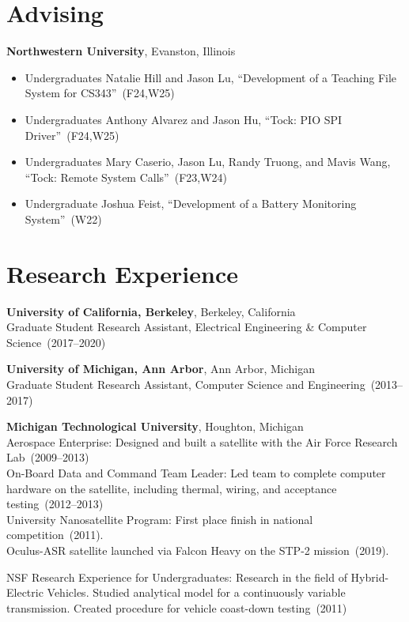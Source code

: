 \documentclass{article}
\begin{document}
\section*{Advising}
\vspace{-6pt}
{\bf Northwestern University}, Evanston, Illinois
\vspace{-6pt}
\begin{itemize}
  \item[] Undergraduates Natalie Hill and Jason Lu, ``Development of a Teaching File System for CS343''~(F24,W25)
  \item[] Undergraduates Anthony Alvarez and Jason Hu, ``Tock: PIO SPI Driver''~(F24,W25)
  \item[] Undergraduates Mary Caserio, Jason Lu, Randy Truong, and Mavis Wang, ``Tock: Remote System Calls''~(F23,W24)
  \item[] Undergraduate Joshua Feist, ``Development of a Battery Monitoring System''~(W22)
\end{itemize}


\section*{Research Experience}
\vspace{-6pt}

{\bf University of California, Berkeley}, Berkeley, California \\
Graduate Student Research Assistant, Electrical Engineering \& Computer Science~(2017--2020)

{\bf University of Michigan, Ann Arbor}, Ann Arbor, Michigan \\
Graduate Student Research Assistant, Computer Science and Engineering~(2013--2017)

{\bf Michigan Technological University}, Houghton, Michigan \\
Aerospace Enterprise: Designed and built a satellite with the Air Force Research Lab~(2009--2013) \\
On-Board Data and Command Team Leader: Led team to complete computer hardware
on the satellite, including thermal, wiring, and acceptance testing~(2012--2013) \\
University Nanosatellite Program: First place finish in national competition~(2011). \\
Oculus-ASR satellite launched via Falcon Heavy on the STP-2 mission~(2019).

NSF Research Experience for Undergraduates: Research in the field of
Hybrid-Electric Vehicles. Studied analytical model for a continuously variable
transmission. Created procedure for vehicle coast-down testing~(2011)
\end{document}
